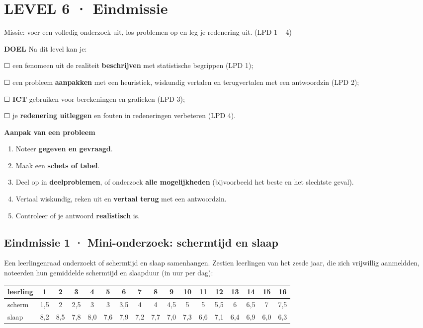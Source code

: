 \section{LEVEL 6 · Eindmissie}

\begin{missie}
Missie: voer een volledig onderzoek uit, los problemen op en leg je redenering uit. (LPD 1 – 4)
\end{missie}

\begin{doel}
\textbf{DOEL} \quad Na dit level kan je:

☐ een fenomeen uit de realiteit \textbf{beschrijven} met statistische begrippen (LPD 1);

☐ een probleem \textbf{aanpakken} met een heuristiek, wiskundig vertalen en terugvertalen met een antwoordzin (LPD 2);

☐ \textbf{ICT} gebruiken voor berekeningen en grafieken (LPD 3);

☐ je \textbf{redenering uitleggen} en fouten in redeneringen verbeteren (LPD 4).
\end{doel}

\begin{theorie}
\textbf{Aanpak van een probleem}

\begin{enumerate}
\item Noteer \textbf{gegeven en gevraagd}.
\item Maak een \textbf{schets of tabel}.
\item Deel op in \textbf{deelproblemen}, of onderzoek \textbf{alle mogelijkheden} (bijvoorbeeld het beste en het slechtste geval).
\item Vertaal wiskundig, reken uit en \textbf{vertaal terug} met een antwoordzin.
\item Controleer of je antwoord \textbf{realistisch} is.
\end{enumerate}
\end{theorie}

\subsection*{Eindmissie 1 · Mini-onderzoek: schermtijd en slaap}

Een leerlingenraad onderzoekt of schermtijd en slaap samenhangen. Zestien leerlingen van het zesde jaar, die zich vrijwillig aanmeldden, noteerden hun gemiddelde schermtijd en slaapduur (in uur per dag):

\begin{tabular}{lcccccccccccccccc}
\hline
leerling & 1 & 2 & 3 & 4 & 5 & 6 & 7 & 8 & 9 & 10 & 11 & 12 & 13 & 14 & 15 & 16 \\
\hline
scherm & 1,5 & 2 & 2,5 & 3 & 3 & 3,5 & 4 & 4 & 4,5 & 5 & 5 & 5,5 & 6 & 6,5 & 7 & 7,5 \\
slaap & 8,2 & 8,5 & 7,8 & 8,0 & 7,6 & 7,9 & 7,2 & 7,7 & 7,0 & 7,3 & 6,6 & 7,1 & 6,4 & 6,9 & 6,0 & 6,3 \\
\hline
\end{tabular}

